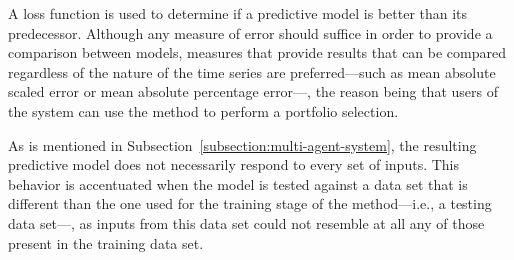 \documentclass{ieeeaccess}
\begin{document}
A loss function is used to determine if a predictive model is better than
its predecessor. Although any measure of error should suffice in order to provide a
comparison between models, measures that provide results that can be compared
regardless of the nature of the time series are preferred---such as mean
absolute scaled error or mean absolute percentage error---, the reason being that
users of the system can use the method to perform a portfolio selection.

As is mentioned in Subsection~\ref{subsection:multi-agent-system}, the
resulting predictive model does not necessarily respond to every set of
inputs. This behavior is accentuated when the model is tested against a data
set that is different than the one used for the training stage of the
method---i.e., a testing data set---, as inputs from this data set could not
resemble at all any of those present in the training data set.



\end{document}
